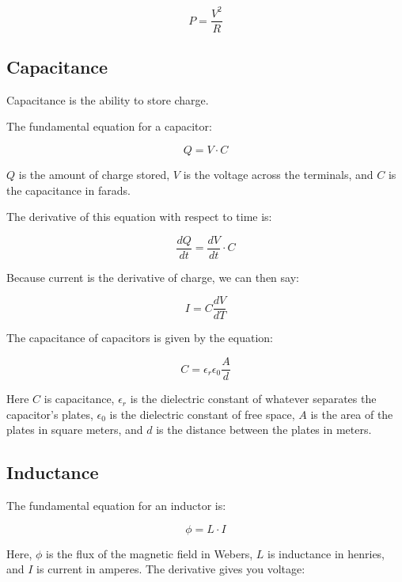\begin{equation}
P = \frac{V^2}{R}
\end{equation}

\subsection{Capacitance}

Capacitance is the ability to store charge.

The fundamental equation for a capacitor:

\begin{equation}
Q = V\cdot C
\end{equation}

$Q$ is the amount of charge stored, $V$ is the voltage across the terminals, and $C$ is the capacitance in farads.

The derivative of this equation with respect to time is:

\begin{equation}
\frac{dQ}{dt} = \frac{dV}{dt}\cdot C
\end{equation}

Because current is the derivative of charge, we can then say:

\begin{equation}
I = C\frac{dV}{dT}
\end{equation}

The capacitance of capacitors is given by the equation:

\begin{equation}
C = \epsilon_r\epsilon_0\frac{A}{d}
\end{equation}

Here $C$ is capacitance, $\epsilon_r$ is the dielectric constant of whatever separates the capacitor's plates, $\epsilon_0$ is the dielectric constant of free space, $A$ is the area of the plates in square meters, and $d$ is the distance between the plates in meters.

\subsection{Inductance}

The fundamental equation for an inductor is:

\begin{equation}
\phi = L\cdot I
\end{equation}

Here, $\phi$ is the flux of the magnetic field in Webers, $L$ is inductance in henries, and $I$ is current in amperes.
The derivative gives you voltage:

